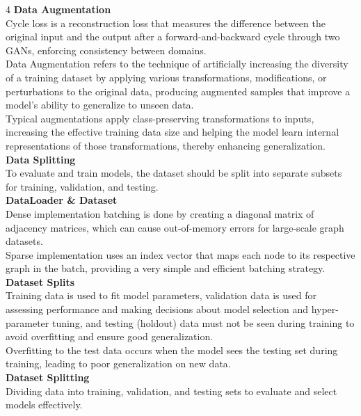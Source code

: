 \documentclass[8pt]{extarticle}
\begin{document}
\begin{multicols}{4}
\vspace{2pt}\textbf{Data Augmentation}\\
Cycle loss is a reconstruction loss that measures the difference between the original input and the output after a forward-and-backward cycle through two GANs, enforcing consistency between domains.\\
Data Augmentation refers to the technique of artificially increasing the diversity of a training dataset by applying various transformations, modifications, or perturbations to the original data, producing augmented samples that improve a model's ability to generalize to unseen data.\\
Typical augmentations apply class-preserving transformations to inputs, increasing the effective training data size and helping the model learn internal representations of those transformations, thereby enhancing generalization.\\
\vspace{2pt}\textbf{Data Splitting}\\
To evaluate and train models, the dataset should be split into separate subsets for training, validation, and testing.\\
\vspace{2pt}\textbf{DataLoader \& Dataset}\\
Dense implementation batching is done by creating a diagonal matrix of adjacency matrices, which can cause out-of-memory errors for large-scale graph datasets.\\
Sparse implementation uses an index vector that maps each node to its respective graph in the batch, providing a very simple and efficient batching strategy.\\
\vspace{2pt}\textbf{Dataset Splits}\\
Training data is used to fit model parameters, validation data is used for assessing performance and making decisions about model selection and hyper-parameter tuning, and testing (holdout) data must not be seen during training to avoid overfitting and ensure good generalization.\\
Overfitting to the test data occurs when the model sees the testing set during training, leading to poor generalization on new data.\\
\vspace{2pt}\textbf{Dataset Splitting}\\
Dividing data into training, validation, and testing sets to evaluate and select models effectively.\\

\end{multicols}
\end{document}
